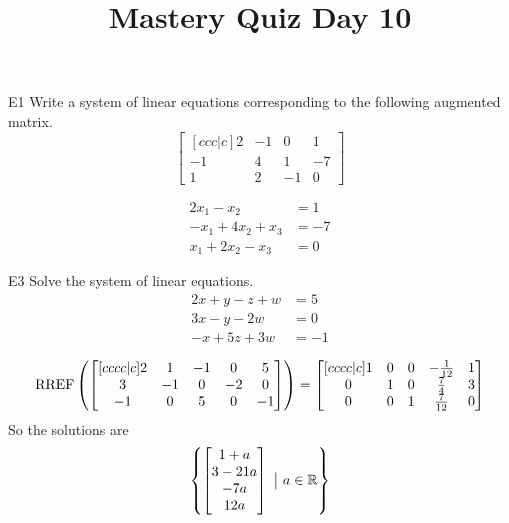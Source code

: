 \documentclass{sbgLAquiz}
\title{Mastery Quiz Day 10 }
\begin{document}
\begin{problem}{E1}
Write a system of linear equations corresponding to the following
augmented matrix.
\[
\begin{bmatrix}[ccc|c]
2 & -1 & 0 & 1  \\
-1 & 4 & 1 & -7  \\
1 & 2 & -1 & 0
\end{bmatrix}
\]
\end{problem}
\begin{solution}
\begin{align*}
2x_1-x_2&=1 \\
-x_1+4x_2+x_3&=-7 \\
x_1+2x_2-x_3 &= 0
\end{align*}
\end{solution}

\begin{problem}{E3}
Solve the system of linear equations.
\begin{align*}
2x+y-z+w &=5 \\
3x-y-2w &= 0 \\
-x+5z+3w&=-1
\end{align*}
\end{problem}
\begin{solution}
$$\operatorname{RREF}\left( \begin{bmatrix}[cccc|c] 2 & 1 & -1 & 0 & 5 \\ 3 & -1 & 0 & -2 & 0 \\ -1 & 0 & 5 & 0 & -1 \end{bmatrix} \right) = \begin{bmatrix}[cccc|c] 1 & 0 & 0 & -\frac{1}{12} & 1 \\ 0 & 1 & 0 & \frac{7}{4} & 3 \\ 0 & 0 & 1 & \frac{7}{12} & 0 \end{bmatrix}$$
So the solutions are $$\left\{ \begin{bmatrix} 1+a \\ 3-21a \\ -7a \\ 12a \end{bmatrix}\ \big|\ a \in \mathbb{R}\right\}$$
\end{solution}
\end{document}
